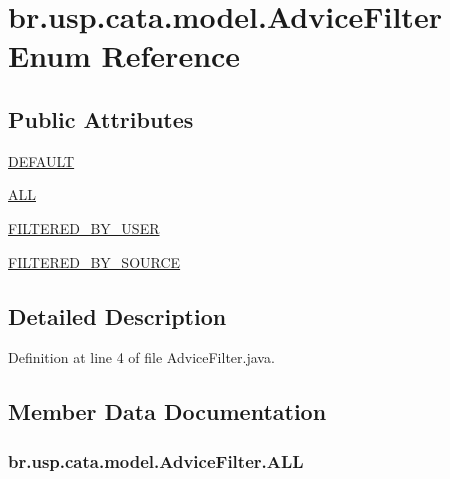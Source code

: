 \hypertarget{enumbr_1_1usp_1_1cata_1_1model_1_1_advice_filter}{\section{br.\+usp.\+cata.\+model.\+Advice\+Filter Enum Reference}
\label{enumbr_1_1usp_1_1cata_1_1model_1_1_advice_filter}
}
\subsection*{Public Attributes}
\begin{DoxyCompactItemize}
\item 
\hyperlink{enumbr_1_1usp_1_1cata_1_1model_1_1_advice_filter_a177db1a9a904ae9c45c5a15bec2f744b}{D\+E\+F\+A\+U\+L\+T}
\item 
\hyperlink{enumbr_1_1usp_1_1cata_1_1model_1_1_advice_filter_ac4f9f5ed3f494cf679c6f4ff8dc40626}{A\+L\+L}
\item 
\hyperlink{enumbr_1_1usp_1_1cata_1_1model_1_1_advice_filter_a0dbcc1f42eed6b783122cb2271eaecfa}{F\+I\+L\+T\+E\+R\+E\+D\+\_\+\+B\+Y\+\_\+\+U\+S\+E\+R}
\item 
\hyperlink{enumbr_1_1usp_1_1cata_1_1model_1_1_advice_filter_a08375d1ac38221c8fb3193a7cb3aca10}{F\+I\+L\+T\+E\+R\+E\+D\+\_\+\+B\+Y\+\_\+\+S\+O\+U\+R\+C\+E}
\end{DoxyCompactItemize}


\subsection{Detailed Description}


Definition at line 4 of file Advice\+Filter.\+java.



\subsection{Member Data Documentation}
\hypertarget{enumbr_1_1usp_1_1cata_1_1model_1_1_advice_filter_ac4f9f5ed3f494cf679c6f4ff8dc40626}{
\subsubsection[{A\+L\+L}]{\setlength{\rightskip}{0pt plus 5cm}br.\+usp.\+cata.\+model.\+Advice\+Filter.\+A\+L\+L}}\label{enumbr_1_1usp_1_1cata_1_1model_1_1_advice_filter_ac4f9f5ed3f494cf679c6f4ff8dc40626}


